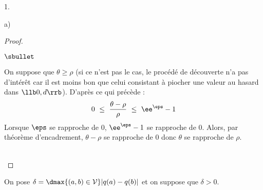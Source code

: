 \documentclass[11pt]{article}%
\begin{document}
\begin{noliste}{1.}
\begin{noliste}{a)}
\begin{proof}
\begin{noliste}{$\sbullet$}
      \item On suppose que $\theta \geq \rho$ (si ce n'est pas le cas,
        le procédé de découverte n'a pas d'intérêt car il est moins
        bon que celui consistant à piocher une valeur au hasard dans
        $\llb 0, d\rrb$). D'après ce qui précède :
        \[
        0 \ \leq \ \dfrac{\theta - \rho}{\rho} \ \leq \ \ee^{\eps} - 1
        \]
        Lorsque $\eps$ se rapproche de $0$, $\ee^{\eps} - 1$ se
        rapproche de $0$. Alors, par théorème d'encadrement, $\theta -
        \rho$ se rapproche de $0$ donc $\theta$ se rapproche de $\rho$.
      \end{noliste}
      ~\\[-1.1cm]
    \end{proof}
  \end{noliste}
\end{noliste}
On pose $\delta = \dmax{(a,b)\in\cal V} |q(a)-q(b)|$ et on suppose que
$\delta > 0$.
\end{document}
